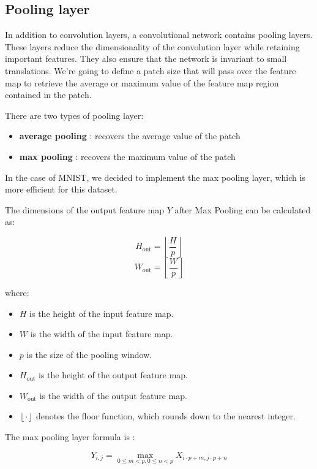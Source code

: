 \documentclass[a4paper, twocolumn, twoside]{article}
\begin{document}
    \subsection{Pooling layer}
    In addition to convolution layers, a convolutional network contains pooling layers. These layers reduce the dimensionality of the convolution layer while retaining important features. They also ensure that the network is invariant to small translations.
    We're going to define a patch size that will pass over the feature map to retrieve the average or maximum value of the feature map region contained in the patch.
    
    There are two types of pooling layer:
    \begin{itemize}
      \item \textbf{average pooling} : recovers the average value of the patch
      \item \textbf{max pooling} : recovers the maximum value of the patch
    \end{itemize}
    
    In the case of MNIST, we decided to implement the max pooling layer, which is more efficient for this dataset.

    The dimensions of the output feature map \( Y \) after Max Pooling can be calculated as:
    
    \[
    H_{\text{out}} = \left\lfloor \frac{H}{p} \right\rfloor
    \]
    \[
    W_{\text{out}} = \left\lfloor \frac{W}{p} \right\rfloor
    \]

where:
\begin{itemize}
  \item \( H \) is the height of the input feature map.
  \item \( W \) is the width of the input feature map.
  \item \( p \) is the size of the pooling window.
  \item \( H_{\text{out}} \) is the height of the output feature map.
  \item \( W_{\text{out}} \) is the width of the output feature map.
  \item \( \left\lfloor \cdot \right\rfloor \) denotes the floor function, which rounds down to the nearest integer.
\end{itemize}

    The max pooling layer formula is : 

    \[
    Y_{i,j} = \max_{0 \leq m < p, 0 \leq n < p} X_{i \cdot p + m, j \cdot p + n}
    \]
    
\end{document}
